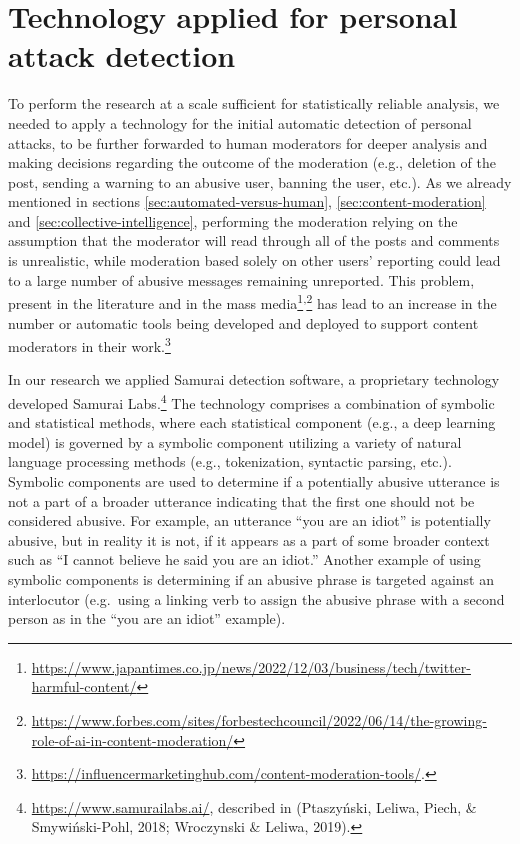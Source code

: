 \documentclass[preprint,12pt]{elsarticle}
\begin{document}
\section{Technology applied for personal attack detection}
\label{sec:technology}

To perform the research at a scale sufficient for statistically reliable analysis, we needed to apply a technology for the initial automatic detection of personal attacks, to be further forwarded to human moderators for deeper analysis and making decisions regarding the outcome of the moderation (e.g., deletion of the post, sending a warning to an abusive user, banning the user, etc.). As we already mentioned in sections \ref{sec:automated-versus-human}, \ref{sec:content-moderation} and \ref{sec:collective-intelligence}, performing the moderation relying on the assumption that the moderator will read through all of the posts and comments is unrealistic, while moderation based solely on  other users' reporting could lead to a large number of abusive messages remaining unreported. This problem, present   in the literature \citep{ptaszynski2018automatic,urbaniak2022personal} and in  the mass media\footnote{\url{https://www.japantimes.co.jp/news/2022/12/03/business/tech/twitter-harmful-content/}}\textsuperscript{,}\footnote{\url{https://www.forbes.com/sites/forbestechcouncil/2022/06/14/the-growing-role-of-ai-in-content-moderation/}} has lead to an increase in the number or automatic tools being developed  and deployed to support content moderators in their work.\footnote{\url{https://influencermarketinghub.com/content-moderation-tools/}.} 

In our research  we applied Samurai detection software, a
proprietary technology developed Samurai Labs.\footnote{\url{https://www.samurailabs.ai/},
  described in (Ptaszyński, Leliwa, Piech, \& Smywiński-Pohl, 2018;
  Wroczynski \& Leliwa, 2019).} The technology comprises a combination
of symbolic and statistical methods, where each statistical component
(e.g., a deep learning model) is governed by a symbolic component
utilizing a variety of natural language processing methods (e.g.,
tokenization, syntactic parsing, etc.). Symbolic components are used to
determine if a potentially abusive utterance is not a part of a broader
utterance indicating that the first one should not be considered
abusive. For example, an utterance ``you are an idiot'' is potentially
abusive, but in reality it is not, if it appears as a part of some broader context
such as ``I cannot believe he said you are an idiot.'' Another
example of using symbolic components is determining if an abusive phrase
is targeted against an interlocutor (e.g.~using a linking verb to assign
the abusive phrase with a second person as in the ``you are an idiot''
example).
\end{document}
